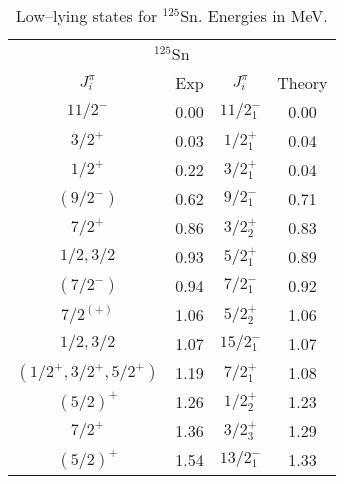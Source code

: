 \begin{table}[htbp]
\begin{center}
\begin{tabular}{cccc}
\hline 
\multicolumn{4}{c}{ $^{125}$Sn} \\ 
{$J^{\pi}_i$} &{Exp} &{$J^{\pi}_i$} &{Theory} \\
\hline 
$11/2^{-}$           & 0.00 & $11/2^{-}_{1}$ & 0.00 \\
$3/2^{+}$            & 0.03 & $1/2^{+}_{1}$  & 0.04 \\
$1/2^{+}$            & 0.22 & $3/2^{+}_{1}$  & 0.04 \\
$(9/2^{-})$          & 0.62 & $9/2^{-}_{1}$  & 0.71 \\
$7/2^{+}$            & 0.86 & $3/2^{+}_{2}$  & 0.83 \\
$1/2,3/2$            & 0.93 & $5/2^{+}_{1}$  & 0.89 \\
$(7/2^{-})$          & 0.94 & $7/2^{-}_{1}$  & 0.92 \\
$7/2^{(+)}$          & 1.06 & $5/2^{+}_{2}$  & 1.06 \\
$1/2,3/2$            & 1.07 & $15/2^{-}_{1}$ & 1.07 \\
$(1/2^{+},3/2^{+},5/2^{+})$ & 1.19 & $7/2^{+}_{1}$ & 1.08 \\
$(5/2)^{+}$          & 1.26 & $1/2^{+}_{2}$  & 1.23 \\
$7/2^{+}$             & 1.36 & $3/2^{+}_{3}$  & 1.29 \\
$(5/2)^{+}$          & 1.54 & $13/2^{-}_{1}$ & 1.33 \\
\hline 
\end{tabular}
\caption{Low--lying states for  $^{125}$Sn. Energies in MeV.}
\label{tab:125sn}
\end{center}
\end{table}

